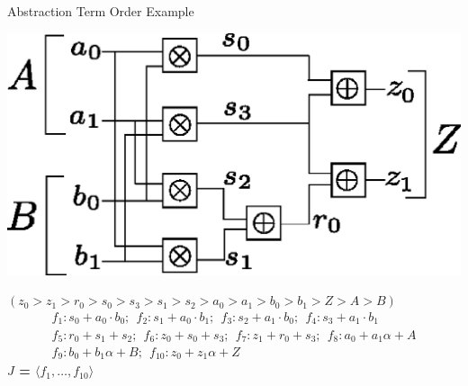 \documentclass[xcolor=dvipsnames]{beamer}
\begin{document}
%




\begin{frame}{\large{Abstraction Term Order Example}}

\centerline{
\includegraphics[scale=0.4]{2bitmult.eps}
}
{\bf $(z_0 > z_1 > r_0 > s_0 > s_3 > s_1 > s_2 > a_0 > a_1 >  b_0 > b_1 > Z > A > B)$}
\begin{align*}
f_1: s_0+a_0 \cdot b_0; ~~f_2: s_1+a_0 \cdot b_1;  ~~f_3: s_2+a_1 \cdot b_0; ~~f_4: s_3+a_1 \cdot b_1  \nonumber \\
f_5: r_0+s_1 + s_2; ~~f_6: z_0+s_0 + s_3; ~~f_7: z_1+r_0+s_3; ~~f_8: a_0 + a_1 \alpha + A \nonumber \\ 
f_9: b_0 + b_1 \alpha + B; ~~f_{10}: z_0 + z_1 \alpha + Z \nonumber
\end{align*}
\vspace{-0.3in}
{\bf $J$ = $\langle f_1, \dots, f_{10} \rangle$}
\end{frame}
\end{document}
